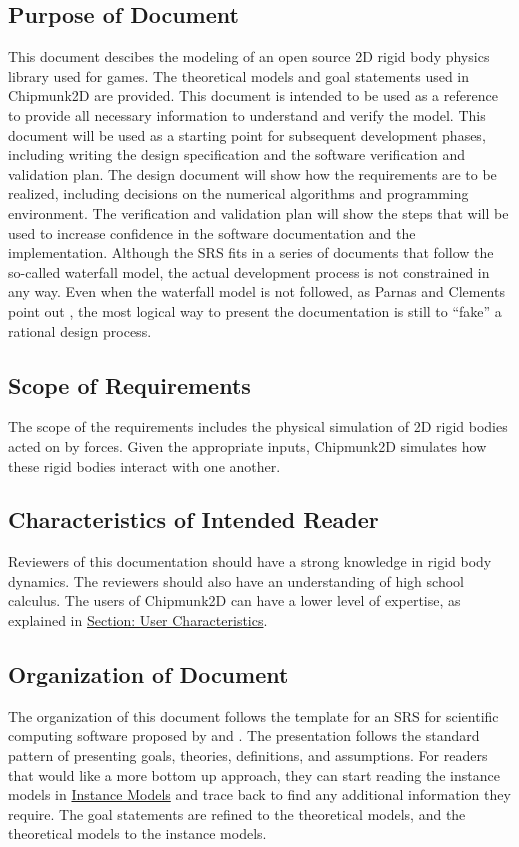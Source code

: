 \documentclass[12pt]{article}
\begin{document}
\subsection{Purpose of Document}
\label{Sec:DocPurpose}
This document descibes the modeling of an open source 2D rigid body physics library used for games. The theoretical models and goal statements used in Chipmunk2D are provided. This document is intended to be used as a reference to provide all necessary information to understand and verify the model.
This document will be used as a starting point for subsequent development phases, including writing the design specification and the software verification and validation plan. The design document will show how the requirements are to be realized, including decisions on the numerical algorithms and programming environment. The verification and validation plan will show the steps that will be used to increase confidence in the software documentation and the implementation. Although the SRS fits in a series of documents that follow the so-called waterfall model, the actual development process is not constrained in any way. Even when the waterfall model is not followed, as Parnas and Clements point out \cite{parnasClements1986}, the most logical way to present the documentation is still to ``fake'' a rational design process.
\subsection{Scope of Requirements}
\label{Sec:ReqsScope}
The scope of the requirements includes the physical simulation of 2D rigid bodies acted on by forces. Given the appropriate inputs, Chipmunk2D simulates how these rigid bodies interact with one another.
\subsection{Characteristics of Intended Reader}
\label{Sec:ReaderChars}
Reviewers of this documentation should have a strong knowledge in rigid body dynamics. The reviewers should also have an understanding of high school calculus. The users of Chipmunk2D can have a lower level of expertise, as explained in \hyperref[Sec:UserChars]{Section: User Characteristics}.
\subsection{Organization of Document}
\label{Sec:DocOrg}
The organization of this document follows the template for an SRS for scientific computing software proposed by \cite{dParnas1972} and \cite{dParnasPcClements1984}. The presentation follows the standard pattern of presenting goals, theories, definitions, and assumptions. For readers that would like a more bottom up approach, they can start reading the instance models in \hyperref[Sec:IMs]{Instance Models} and trace back to find any additional information they require.
The goal statements are refined to the theoretical models, and the theoretical models to the instance models.
\end{document}
